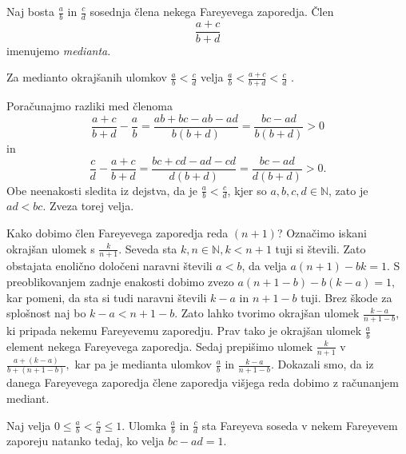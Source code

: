 \documentclass[mat1]{fmfdelo}
\begin{document}
%
\begin{definicija}
Naj bosta $\frac{a}{b}$ in $\frac{c}{d}$ sosednja člena nekega Fareyevega zaporedja. Člen \[\frac{a+c}{b+d} \] imenujemo \emph{medianta}.
\end{definicija}

\begin{trditev}
Za medianto okrajšanih ulomkov \(\frac{a}{b} < \frac{c}{d}\) velja  \(\frac{a}{b} < \frac{a+c}{b+d} < \frac{c}{d}\) .
\end{trditev}

\begin{dokaz}
Poračunajmo razliki med členoma
\[\frac{a+c}{b+d} - \frac{a}{b} = \frac{ab+bc-ab-ad}{b(b+d)} = \frac{bc-ad}{b(b+d)} > 0\] in
\[\frac{c}{d} - \frac{a+c}{b+d} = \frac{bc+cd-ad-cd}{d(b+d)} = \frac{bc-ad}{d(b+d)} > 0.\]
Obe neenakosti sledita iz dejstva, da je \(\frac{a}{b} < \frac{c}{d}\), kjer so \(a, b, c, d \in \mathbb{N} \), zato je \( ad < bc.\)
Zveza torej velja. 
\end{dokaz}

%
Kako dobimo člen Fareyevega zaporedja reda $(n+1)$?
Označimo iskani okrajšan ulomek s $\frac{k}{n+1}$. Seveda sta $k, n \in\mathbb{N}, k < n+1$ tuji si števili. Zato obstajata enolično določeni naravni števili $a < b$, da velja $a(n+1)-bk=1.$ S preoblikovanjem zadnje enakosti dobimo zvezo $a(n+1-b)-b(k-a)=1,$ kar pomeni, da sta si tudi naravni števili $k-a$ in $n+1-b$ tuji. Brez škode za splošnost naj bo $k-a<n+1-b.$ Zato lahko tvorimo okrajšan ulomek $\frac{k-a}{n+1-b}$, ki pripada nekemu Fareyevemu zaporedju. Prav tako je okrajšan ulomek $\frac{a}{b}$ element nekega Fareyevega zaporedja. Sedaj prepišimo ulomek $\frac{k}{n+1}$ v $\frac{a+(k-a)}{b+(n+1-b)},$ kar pa je medianta ulomkov $\frac{a}{b}$ in $\frac{k-a}{n+1-b}.$ Dokazali smo, da iz danega Fareyevega zaporedja člene zaporedja višjega reda dobimo z računanjem mediant.

\begin{trditev}
Naj velja \( 0 \leq \frac{a}{b} < \frac{c}{d} \leq 1\). Ulomka $\frac{a}{b}$ in $\frac{c}{d}$ sta Fareyeva soseda v nekem Fareyevem zaporeju natanko tedaj, ko velja \(bc - ad = 1\).
\end{trditev}
\end{document}

